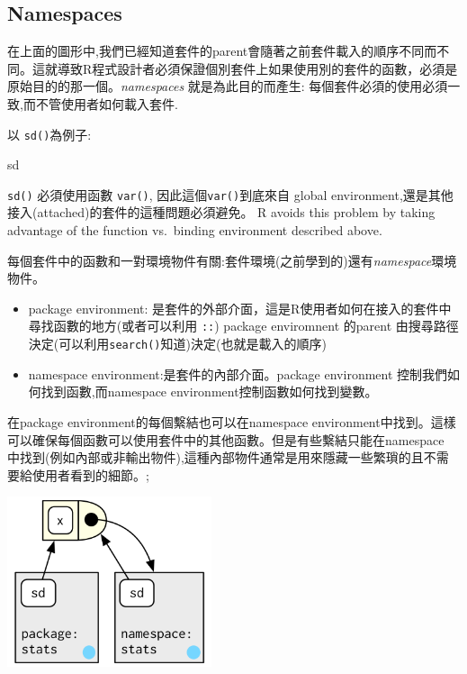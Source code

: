 \documentclass[]{book}
\newenvironment{Shaded}{\begin{snugshade}}{\end{snugshade}}
\newcommand{\NormalTok}[1]{#1}
\theoremstyle{definition}
\theoremstyle{definition}
\theoremstyle{definition}
\theoremstyle{remark}
\begin{document}
\hypertarget{namespaces}{%
\subsection{Namespaces}\label{namespaces}}

在上面的圖形中,我們已經知道套件的parent會隨著之前套件載入的順序不同而不同。這就導致R程式設計者必須保證個別套件上如果使用別的套件的函數，必須是原始目的的那一個。\emph{namespaces}
就是為此目的而產生: 每個套件必須的使用必須一致,而不管使用者如何載入套件.

以 \texttt{sd()}為例子:

\begin{Shaded}
\begin{Highlighting}[]
\NormalTok{sd}
\end{Highlighting}
\end{Shaded}

\texttt{sd()} 必須使用函數 \texttt{var()},
因此這個\texttt{var()}到底來自 global
environment,還是其他接入(attached)的套件的這種問題必須避免。 R avoids
this problem by taking advantage of the function vs.~binding environment
described above.

每個套件中的函數和一對環境物件有關:套件環境(之前學到的)還有\emph{namespace}環境物件。

\begin{itemize}
\item
  package environment:
  是套件的外部介面，這是R使用者如何在接入的套件中尋找函數的地方(或者可以利用
  \texttt{::}) package enviromnent 的parent
  由搜尋路徑決定(可以利用\texttt{search()}知道)決定(也就是載入的順序)
\item
  namespace environment:是套件的內部介面。package environment
  控制我們如何找到函數,而namespace environment控制函數如何找到變數。
\end{itemize}

在package environment的每個繫結也可以在namespace
environment中找到。這樣可以確保每個函數可以使用套件中的其他函數。但是有些繫結只能在namespace
中找到(例如內部或非輸出物件),這種內部物件通常是用來隱藏一些繁瑣的且不需要給使用者看到的細節。;

\begin{center}\includegraphics[width=2.36in]{diagrams/environments/namespace-bind} \end{center}
\end{document}
